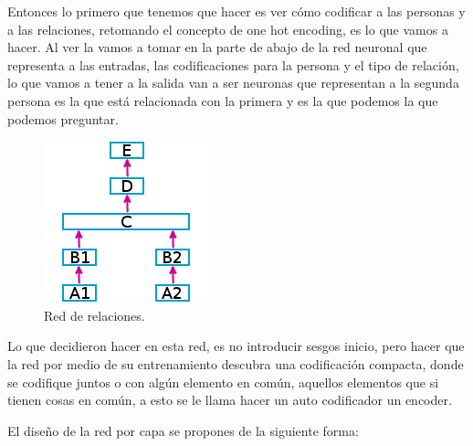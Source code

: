 Entonces lo primero que tenemos que hacer es ver cómo codificar a las personas y a las relaciones, 
retomando el concepto de one hot encoding, es lo que vamos a hacer. Al ver la  vamos a tomar en la parte de abajo de la red neuronal que representa a las entradas, las codificaciones para la persona y el tipo de relación, lo que vamos a tener a la salida van a ser neuronas que representan a la segunda persona es la que está relacionada con la primera y es la que podemos la que podemos preguntar.

  \begin{figure}[h]
   \centering
   \includegraphics[scale=.5]{../Figuras/Hinton/RedRelaciones.png}
   \caption{Red de relaciones.}
  \label{fig:redRelaciones}
  \end{figure}

Lo que decidieron hacer en esta red, es no introducir sesgos inicio, pero hacer que la red por medio de su entrenamiento descubra una codificación compacta, donde se codifique juntos o con algún elemento en común, aquellos elementos que si tienen cosas en común, a esto se le llama hacer un auto codificador un encoder. 

El diseño de la red por capa se propones de la siguiente forma:

